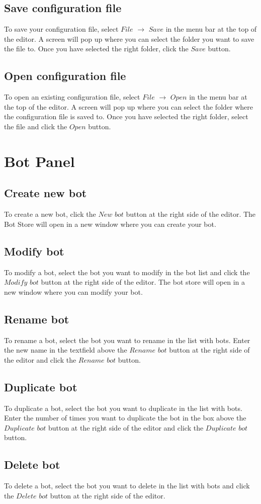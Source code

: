 \documentclass[a4paper]{article}
\begin{document}
\subsection{Save configuration file}
To save your configuration file, select $File$ $\to$ $Save$ in the menu bar at the top of the editor. A screen will pop up where you can select the folder you want to save the file to. Once you have selected the right folder, click the $Save$ button.

\subsection{Open configuration file}
To open an existing configuration file, select $File$ $\to$ $Open$ in the menu bar at the top of the editor. A screen will pop up where you can select the folder where the configuration file is saved to. Once you have selected the right folder, select the file and click the $Open$ button.

\section{Bot Panel}
\subsection{Create new bot}
To create a new bot, click the $New$ $bot$ button at the right side of the editor. The Bot Store will open in a new window where you can create your bot.

\subsection{Modify bot}
To modify a bot, select the bot you want to modify in the bot list and click the $Modify$ $bot$ button at the right side of the editor. The bot store will open in a new window where you can modify your bot.

\subsection{Rename bot}
To rename a bot, select the bot you want to rename in the list with bots. Enter the new name in the textfield above the $Rename$ $bot$ button at the right side of the editor and click the $Rename$ $bot$ button.

\subsection{Duplicate bot}
To duplicate a bot, select the bot you want to duplicate in the list with bots. Enter the number of times you want to duplicate the bot in the box above the $Duplicate$ $bot$ button at the right side of the editor and click the $Duplicate$ $bot$ button.

\subsection{Delete bot}
To delete a bot, select the bot you want to delete in the list with bots and click the $Delete$ $bot$ button at the right side of the editor.
\end{document}
